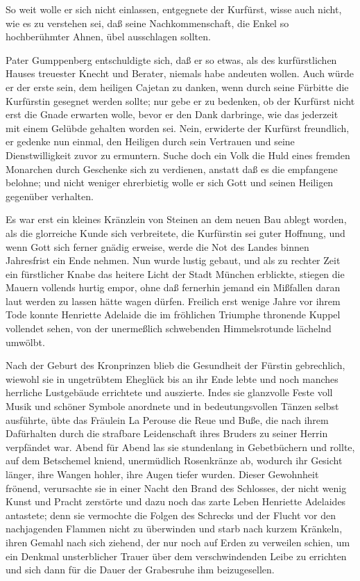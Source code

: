 So weit wolle er sich nicht einlassen, entgegnete der Kurfürst,
wisse auch nicht, wie es zu verstehen sei, daß seine
Nachkommenschaft, die Enkel so hochberühmter Ahnen, übel
ausschlagen sollten.

Pater Gumppenberg entschuldigte sich, daß er so etwas, als des
kurfürstlichen Hauses treuester Knecht und Berater, niemals habe
andeuten wollen. Auch würde er der erste sein, dem heiligen Cajetan
zu danken, wenn durch seine Fürbitte\pagenum{[122]} die Kurfürstin
gesegnet werden sollte; nur gebe er zu bedenken, ob der Kurfürst
nicht erst die Gnade erwarten wolle, bevor er den Dank darbringe,
wie das jederzeit mit einem Gelübde gehalten worden sei. Nein,
erwiderte der Kurfürst freundlich, er gedenke nun einmal, den
Heiligen durch sein Vertrauen und seine Dienstwilligkeit zuvor zu
ermuntern. Suche doch ein Volk die Huld eines fremden Monarchen
durch Geschenke sich zu verdienen, anstatt daß es die empfangene
belohne; und nicht weniger ehrerbietig wolle er sich Gott und
seinen Heiligen gegenüber verhalten.

Es war erst ein kleines Kränzlein von Steinen an dem neuen Bau
ablegt worden, als die glorreiche Kunde sich verbreitete, die
Kurfürstin sei guter Hoffnung, und wenn Gott sich ferner gnädig
erweise, werde die Not des Landes binnen Jahresfrist ein Ende
nehmen. Nun wurde lustig gebaut, und als zu rechter Zeit ein
fürstlicher Knabe das heitere Licht der Stadt München erblickte,
stiegen die Mauern vollends hurtig empor, ohne daß fernerhin jemand
ein Mißfallen daran laut werden zu lassen hätte wagen dürfen.
Freilich erst wenige Jahre vor ihrem Tode konnte Henriette Adelaide
die im fröhlichen Triumphe thronende Kuppel vollendet sehen, von
der unermeßlich schwebenden Himmelsrotunde lächelnd umwölbt.

Nach der Geburt des Kronprinzen blieb die Gesundheit der Fürstin
gebrechlich, wiewohl sie in ungetrübtem Eheglück bis an ihr Ende
lebte und noch manches herrliche Lustgebäude errichtete und
auszierte. Indes sie glanzvolle Feste voll Musik und schöner
Symbole anordnete und in bedeutungsvollen Tänzen selbst ausführte,
übte das Fräulein La Perouse die Reue und Buße, die nach ihrem
Dafürhalten durch die strafbare Leidenschaft ihres Bruders zu
seiner\pagenum{[123]} Herrin verpfändet war. Abend für Abend las
sie stundenlang in Gebetbüchern und rollte, auf dem Betschemel
kniend, unermüdlich Rosenkränze ab, wodurch ihr Gesicht länger,
ihre Wangen hohler, ihre Augen tiefer wurden. Dieser Gewohnheit
frönend, verursachte sie in einer Nacht den Brand des Schlosses,
der nicht wenig Kunst und Pracht zerstörte und dazu noch das zarte
Leben Henriette Adelaides antastete; denn sie vermochte die Folgen
des Schrecks und der Flucht vor den nachjagenden Flammen nicht zu
überwinden und starb nach kurzem Kränkeln, ihren Gemahl nach sich
ziehend, der nur noch auf Erden zu verweilen schien, um ein Denkmal
unsterblicher Trauer über dem verschwindenden Leibe zu errichten
und sich dann für die Dauer der Grabesruhe ihm beizugesellen.


